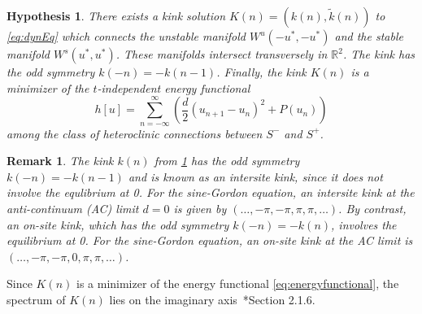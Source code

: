 \documentclass[12pt,reqno]{amsart}
\def\R{{\mathbb R}}
\newtheorem{hypothesis}{Hypothesis}
\newtheorem{remark}{Remark}
\begin{document}
\begin{hypothesis}\label{hyp:kinkexists}
There exists a kink solution $K(n) = (k(n),\tilde{k}(n))$ to \cref{eq:dynEq} which connects the unstable manifold $W^u(-u^*, -u^*)$ and the stable manifold $W^s(u^*, u^*)$. These manifolds intersect transversely in $\R^2$. 
The kink has the odd symmetry $k(-n) = -k(n-1)$. Finally, 
the kink $K(n)$ is a minimizer of the $t$-independent energy functional
\begin{equation}\label{eq:energyfunctional}
h[u] = \sum_{n=-\infty}^\infty 
\left( \frac{d}{2} (u_{n+1} - u_n)^2 + P(u_n) \right)
\end{equation}
{among the class of heteroclinic connections between $S^-$ and $S^+$.}
\end{hypothesis}

\begin{remark}
The kink $k(n)$ from \cref{hyp:kinkexists} has the odd symmetry $k(-n) = -k(n-1)$ and is known as an intersite kink, since it does not involve the equlibrium at 0. For the sine-Gordon equation, an intersite kink at the anti-continuum (AC) limit 
{$d = 0$} is given by $(\dots, -\pi, -\pi, \pi, \pi, \dots)$. By contrast, an on-site kink, which has the odd symmetry $k(-n) = -k(n)$, involves the equilibrium at 0. For the sine-Gordon equation, an on-site kink at the AC limit is $(\dots, -\pi, -\pi, 0, \pi, \pi, \dots)$. 
\end{remark}

{Since $K(n)$ is a minimizer of the energy functional \cref{eq:energyfunctional}, the spectrum of $K(n)$ lies on the imaginary axis~\cite{KevrekidisWeinstein2000}*{Section 2.1.6}.}
\end{document}
